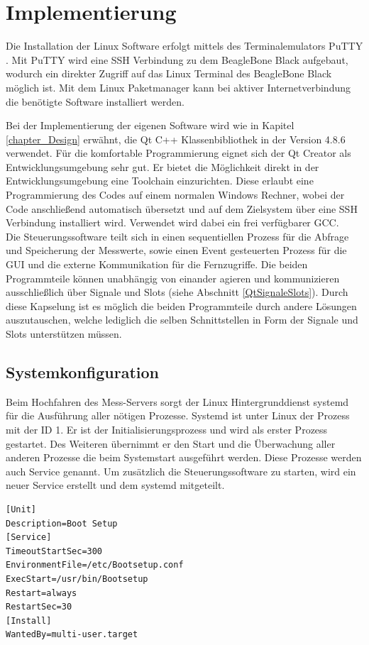 \chapter{Implementierung}
\label{chapter_Implementierung}



Die Installation der Linux Software erfolgt mittels des Terminalemulators PuTTY \cite{putty}. Mit \mbox{PuTTY} wird eine \ac{SSH} Verbindung zu dem BeagleBone Black aufgebaut, wodurch ein direkter Zugriff auf das Linux Terminal des BeagleBone Black möglich ist. Mit dem Linux Paketmanager kann bei aktiver Internetverbindung die benötigte Software installiert werden.\ 

Bei der Implementierung der eigenen Software wird wie in Kapitel \ref{chapter_Design} erwähnt, die Qt C++ Klassenbibliothek in der Version 4.8.6 verwendet. Für die komfortable Programmierung eignet sich der Qt Creator als Entwicklungsumgebung sehr gut. Er bietet die Möglichkeit direkt in der Entwicklungsumgebung eine Toolchain einzurichten. Diese erlaubt eine Programmierung des Codes auf einem normalen Windows Rechner, wobei der Code anschließend automatisch übersetzt und auf dem Zielsystem über eine \ac{SSH} Verbindung installiert wird. Verwendet wird dabei ein frei verfügbarer \ac{GCC}.\\
Die Steuerungssoftware teilt sich in einen sequentiellen Prozess für die Abfrage und Speicherung der Messwerte, sowie einen Event gesteuerten Prozess für die \ac{GUI} und die externe Kommunikation für die Fernzugriffe. 
Die beiden Programmteile können unabhängig von einander agieren und kommunizieren ausschließlich über Signale und Slots (siehe Abschnitt \ref{QtSignaleSlots}). Durch diese Kapselung ist es möglich die beiden Programmteile durch andere Lösungen auszutauschen, welche lediglich die selben Schnittstellen in Form der Signale und Slots unterstützen müssen.

\section{Systemkonfiguration}

Beim Hochfahren des Mess-Servers sorgt der Linux Hintergrunddienst systemd für die Ausführung aller nötigen Prozesse. Systemd ist unter Linux der Prozess mit der ID 1. Er ist der Initialisierungsprozess und wird als erster Prozess gestartet. Des Weiteren übernimmt er den Start und die Überwachung aller anderen Prozesse die beim Systemstart ausgeführt werden. Diese Prozesse werden auch Service genannt. Um zusätzlich die Steuerungssoftware zu starten, wird ein neuer Service erstellt und dem systemd mitgeteilt.\\
\newpage
\begin{lstlisting}[caption={Systemd Service},label=lst_SystemdService]
[Unit]
Description=Boot Setup
[Service]
TimeoutStartSec=300
EnvironmentFile=/etc/Bootsetup.conf
ExecStart=/usr/bin/Bootsetup
Restart=always
RestartSec=30
[Install]
WantedBy=multi-user.target
\end{lstlisting}


